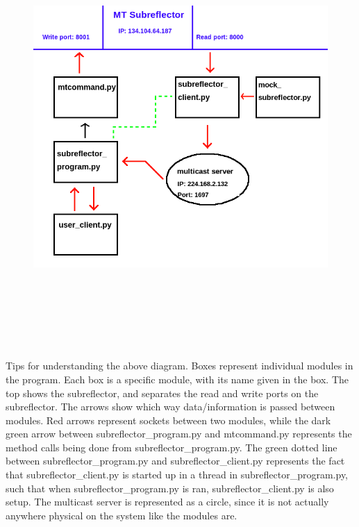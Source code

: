 \documentclass{article}
\begin{document}
 \begin{figure}[H]
\includegraphics[width=16cm, height=16cm]{program_diagram}
\centering
\end{figure}


 \vspace{10pt}

Tips for understanding the above diagram. Boxes represent individual modules in the program. Each box is a specific module, with its name given in the box. The top shows the subreflector, and separates the read and write ports on the subreflector.  The arrows show which way data/information is passed between modules. Red arrows represent sockets between two modules, while the dark green arrow between subreflector\_program.py and mtcommand.py represents the method calls being done from subreflector\_program.py. The green dotted line between subreflector\_program.py and subreflector\_client.py represents the fact that subreflector\_client.py is started up in a thread in subreflector\_program.py, such that when subreflector\_program.py is ran, subreflector\_client.py is also setup. The multicast server is represented as a circle, since it is not actually anywhere physical on the system like the modules are.
\end{document}
